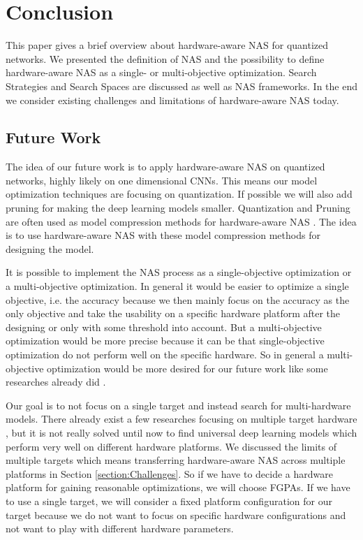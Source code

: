 \documentclass[conference]{IEEEtran}
\begin{document}
\section{Conclusion}

This paper gives a brief overview about hardware-aware NAS for quantized networks. We presented the definition of NAS and the possibility to define hardware-aware NAS as a single- or multi-objective optimization. Search Strategies and Search Spaces are discussed as well as NAS frameworks. In the end we consider existing challenges and limitations of hardware-aware NAS today.

\subsection{Future Work}

The idea of our future work is to apply hardware-aware NAS on quantized networks, highly likely on one dimensional CNNs. This means our model optimization techniques are focusing on quantization. If possible we will also add pruning for making the deep learning models smaller. Quantization and Pruning are often used as model compression methods for hardware-aware NAS \cite{bib5}\cite{bib15}\cite{bib18}\cite{bib22}. The idea is to use hardware-aware NAS with these model compression methods for designing the model. 

It is possible to implement the NAS process as a single-objective optimization or a multi-objective optimization. In general it would be easier to optimize a single objective, i.e. the accuracy because we then mainly focus on the accuracy as the only objective and take the usability on a specific hardware platform after the designing or only with some threshold into account. But a multi-objective optimization would be more precise because it can be that single-objective optimization do not perform well on the specific hardware. So in general a multi-objective optimization would be more desired for our future work like some researches already did \cite{bib15}\cite{bib16}.

Our goal is to not focus on a single target and instead search for multi-hardware models. There already exist a few researches focusing on multiple target hardware \cite{bib17}\cite{bib18}, but it is not really solved until now to find universal deep learning models which perform very well on different hardware platforms. We discussed the limits of multiple targets which means transferring hardware-aware NAS across multiple platforms in Section \ref{section:Challenges}. So if we have to decide a hardware platform for gaining reasonable optimizations, we will choose FGPAs. If we have to use a single target, we will consider a fixed platform configuration for our target because we do not want to focus on specific hardware configurations and not want to play with different hardware parameters. 
\end{document}
